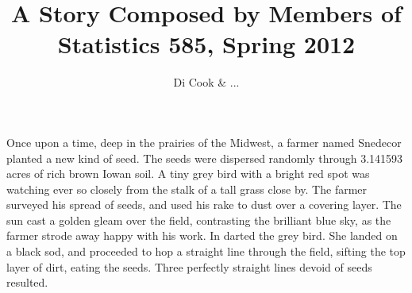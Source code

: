 \documentclass{article}
\begin{document}
\title{A Story Composed by Members of Statistics 585, Spring 2012}
\author{Di Cook \& ...}
\maketitle

Once upon a time, deep in the prairies of the Midwest, a farmer named Snedecor planted a new kind of seed. The seeds were dispersed randomly through 3.141593 acres of rich brown Iowan soil. A tiny grey bird with a bright red spot was watching ever so closely  from the stalk of a tall grass close by. The farmer surveyed his spread of seeds, and used his rake to dust  over a covering layer. The sun cast a golden gleam over the field, contrasting the brilliant blue sky, as the farmer strode away happy with his work. In darted the grey bird. She landed on a black sod, and proceeded to hop a straight line through the field, sifting the top layer of dirt, eating the seeds. Three perfectly straight lines devoid of seeds resulted. 
\end{document}
